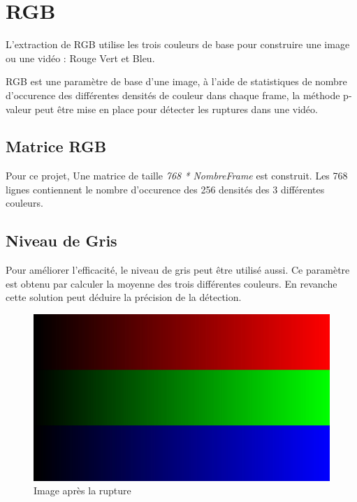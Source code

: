 \section{RGB}
L’extraction de RGB utilise les trois couleurs de base pour construire une image ou une vidéo : Rouge Vert et Bleu.

RGB est une paramètre de base d’une image, à l’aide de statistiques de nombre d’occurence des différentes densités de couleur dans chaque frame, la méthode p-valeur peut être mise en place pour détecter les ruptures dans une vidéo.

\subsection{Matrice RGB}

Pour ce projet, Une matrice de taille \textit{768 * NombreFrame} est construit. Les 768 lignes contiennent le nombre d'occurence des 256 densités des 3 différentes couleurs.

\subsection{Niveau de Gris}
Pour améliorer l’efficacité, le niveau de gris peut être utilisé aussi. Ce paramètre est obtenu par calculer la moyenne des trois différentes couleurs. En revanche cette solution peut déduire la précision de la détection.

\begin{figure}[h!]
      \centering
      \includegraphics[scale=0.12]{img/RGB.jpg}
      \caption{\label{Après} Image après la rupture}
\end{figure}


